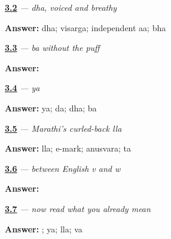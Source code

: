 \noindent\begin{minipage}[t]{\linewidth}
\raggedright
\hyperlink{review-MR-W03-dha-r2-a}{\textbf{3.2}} \emph{ — dha, voiced and breathy}\par
\small \textbf{Answer:} dha; visarga; independent aa; bha\par
\end{minipage}\par\medskip

\noindent\begin{minipage}[t]{\linewidth}
\raggedright
\hyperlink{review-MR-W03-ba-dictation}{\textbf{3.3}} \emph{ — ba without the puff}\par
\small \textbf{Answer:} \par
\end{minipage}\par\medskip

\noindent\begin{minipage}[t]{\linewidth}
\raggedright
\hyperlink{review-MR-W03-ya-r1}{\textbf{3.4}} \emph{ — ya}\par
\small \textbf{Answer:} ya; da; dha; ba\par
\end{minipage}\par\medskip

\noindent\begin{minipage}[t]{\linewidth}
\raggedright
\hyperlink{review-MR-W03-lla-r2-b}{\textbf{3.5}} \emph{ — Marathi's curled-back lla}\par
\small \textbf{Answer:} lla; e-mark; anusvara; ta\par
\end{minipage}\par\medskip

\noindent\begin{minipage}[t]{\linewidth}
\raggedright
\hyperlink{review-MR-W03-va-dictation}{\textbf{3.6}} \emph{ — between English v and w}\par
\small \textbf{Answer:} \par
\end{minipage}\par\medskip

\noindent\begin{minipage}[t]{\linewidth}
\raggedright
\hyperlink{review-MR-W03-dhanyavad-write-four-skills}{\textbf{3.7}} \emph{ — now read what you already mean}\par
\small \textbf{Answer:} ; ya; lla; va\par
\end{minipage}\par\medskip

